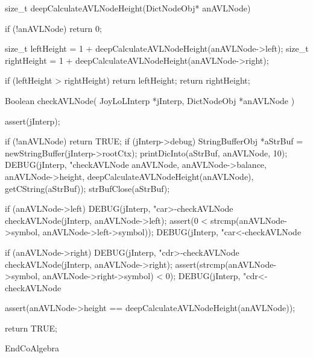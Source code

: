size_t deepCalculateAVLNodeHeight(DictNodeObj* anAVLNode) {
  if (!anAVLNode) return 0;

  size_t leftHeight = 1 + deepCalculateAVLNodeHeight(anAVLNode->left);
  size_t rightHeight = 1 + deepCalculateAVLNodeHeight(anAVLNode->right);

  if (leftHeight > rightHeight) return leftHeight;
  return rightHeight;
}

Boolean checkAVLNode(
  JoyLoLInterp *jInterp,
  DictNodeObj  *anAVLNode
) {
  assert(jInterp);
 
  if (!anAVLNode) return TRUE;
  if (jInterp->debug) {
    StringBufferObj *aStrBuf =
      newStringBuffer(jInterp->rootCtx);
    printDicInto(aStrBuf, anAVLNode, 10);
    DEBUG(jInterp, "checkAVLNode %
          anAVLNode, anAVLNode->balance, anAVLNode->height,
          deepCalculateAVLNodeHeight(anAVLNode),
          getCString(aStrBuf));
    strBufClose(aStrBuf);
  }

  if (anAVLNode->left) {
      DEBUG(jInterp, "car>-checkAVLNode %
      checkAVLNode(jInterp, anAVLNode->left);
      assert(0 < strcmp(anAVLNode->symbol,
                      anAVLNode->left->symbol));
    DEBUG(jInterp, "car<-checkAVLNode %
  }

  if (anAVLNode->right) {
    DEBUG(jInterp, "cdr>-checkAVLNode %
    checkAVLNode(jInterp, anAVLNode->right);
    assert(strcmp(anAVLNode->symbol,
                  anAVLNode->right->symbol) < 0);
    DEBUG(jInterp, "cdr<-checkAVLNode %
  }

  assert(anAVLNode->height == deepCalculateAVLNodeHeight(anAVLNode));

  return TRUE;
}

EndCoAlgebra
\stopJoyLoLCode